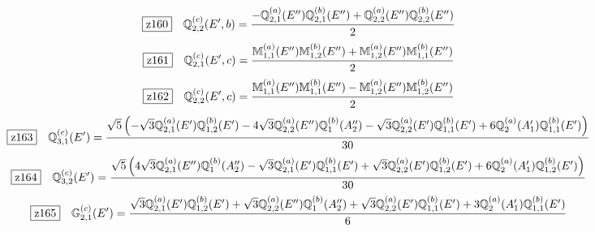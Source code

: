 \documentclass[fleqn,10pt,landscape]{jsarticle}
\begin{document}
\begin{dmath*}
\hspace*{3mm}\fbox{z160}\quad \mathbb{Q}_{2,2}^{(c)}(E^{\prime},b)=\frac{- \mathbb{Q}_{2,1}^{(a)}(E^{\prime\prime}) \mathbb{Q}_{2,1}^{(b)}(E^{\prime\prime}) + \mathbb{Q}_{2,2}^{(a)}(E^{\prime\prime}) \mathbb{Q}_{2,2}^{(b)}(E^{\prime\prime})}{2}
\end{dmath*}
\begin{dmath*}
\hspace*{3mm}\fbox{z161}\quad \mathbb{Q}_{2,1}^{(c)}(E^{\prime},c)=\frac{\mathbb{M}_{1,1}^{(a)}(E^{\prime\prime}) \mathbb{M}_{1,2}^{(b)}(E^{\prime\prime}) + \mathbb{M}_{1,2}^{(a)}(E^{\prime\prime}) \mathbb{M}_{1,1}^{(b)}(E^{\prime\prime})}{2}
\end{dmath*}
\begin{dmath*}
\hspace*{3mm}\fbox{z162}\quad \mathbb{Q}_{2,2}^{(c)}(E^{\prime},c)=\frac{\mathbb{M}_{1,1}^{(a)}(E^{\prime\prime}) \mathbb{M}_{1,1}^{(b)}(E^{\prime\prime}) - \mathbb{M}_{1,2}^{(a)}(E^{\prime\prime}) \mathbb{M}_{1,2}^{(b)}(E^{\prime\prime})}{2}
\end{dmath*}
\begin{dmath*}
\hspace*{3mm}\fbox{z163}\quad \mathbb{Q}_{3,1}^{(c)}(E^{\prime})=\frac{\sqrt{5} \left(- \sqrt{3} \mathbb{Q}_{2,1}^{(a)}(E^{\prime}) \mathbb{Q}_{1,2}^{(b)}(E^{\prime}) - 4 \sqrt{3} \mathbb{Q}_{2,2}^{(a)}(E^{\prime\prime}) \mathbb{Q}_{1}^{(b)}(A_{2}^{\prime\prime}) - \sqrt{3} \mathbb{Q}_{2,2}^{(a)}(E^{\prime}) \mathbb{Q}_{1,1}^{(b)}(E^{\prime}) + 6 \mathbb{Q}_{2}^{(a)}(A_{1}^{\prime}) \mathbb{Q}_{1,1}^{(b)}(E^{\prime})\right)}{30}
\end{dmath*}
\begin{dmath*}
\hspace*{3mm}\fbox{z164}\quad \mathbb{Q}_{3,2}^{(c)}(E^{\prime})=\frac{\sqrt{5} \left(4 \sqrt{3} \mathbb{Q}_{2,1}^{(a)}(E^{\prime\prime}) \mathbb{Q}_{1}^{(b)}(A_{2}^{\prime\prime}) - \sqrt{3} \mathbb{Q}_{2,1}^{(a)}(E^{\prime}) \mathbb{Q}_{1,1}^{(b)}(E^{\prime}) + \sqrt{3} \mathbb{Q}_{2,2}^{(a)}(E^{\prime}) \mathbb{Q}_{1,2}^{(b)}(E^{\prime}) + 6 \mathbb{Q}_{2}^{(a)}(A_{1}^{\prime}) \mathbb{Q}_{1,2}^{(b)}(E^{\prime})\right)}{30}
\end{dmath*}
\begin{dmath*}
\hspace*{3mm}\fbox{z165}\quad \mathbb{G}_{2,1}^{(c)}(E^{\prime})=\frac{\sqrt{3} \mathbb{Q}_{2,1}^{(a)}(E^{\prime}) \mathbb{Q}_{1,2}^{(b)}(E^{\prime}) + \sqrt{3} \mathbb{Q}_{2,2}^{(a)}(E^{\prime\prime}) \mathbb{Q}_{1}^{(b)}(A_{2}^{\prime\prime}) + \sqrt{3} \mathbb{Q}_{2,2}^{(a)}(E^{\prime}) \mathbb{Q}_{1,1}^{(b)}(E^{\prime}) + 3 \mathbb{Q}_{2}^{(a)}(A_{1}^{\prime}) \mathbb{Q}_{1,1}^{(b)}(E^{\prime})}{6}
\end{dmath*}
\end{document}
